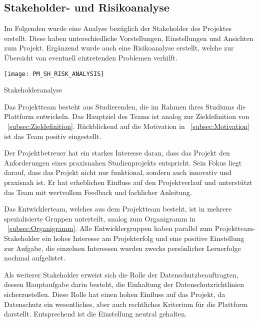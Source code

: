 \subsection{Stakeholder- und Risikoanalyse}\label{subsec:Stakeholder-Risikoanalyse}
Im Folgenden wurde eine Analyse bezüglich der Stakeholder des Projektes erstellt.
Diese haben unterschiedliche Vorstellungen, Einstellungen und Ansichten zum Projekt.
Ergänzend wurde auch eine Risikoanalyse erstellt, welche zur Übersicht von eventuell eintretenden Problemen verhilft. \par
\newpage %


\begin{table}[h!]
    \centering
    \texttt{[image: PM\_SH\_RISK\_ANALYSIS]}
    \caption{Stakeholderanalyse}\label{tab:stakegolderanalyse}
\end{table}

Das Projektteam besteht aus Studierenden, die im Rahmen ihres Studiums die Plattform entwickeln.
Das Hauptziel des Teams ist analog zur Zieldefinition von ~\ref{subsec:Zieldefinition}.
Rückblickend auf die Motivation in ~\ref{subsec:Motivation} ist das Team positiv eingestellt. \par

Der Projektbetreuer hat ein starkes Interesse daran, dass das Projekt den Anforderungen eines praxisnahen Studienprojekts entspricht.
Sein Fokus liegt darauf, dass das Projekt nicht nur funktional, sondern auch innovativ und praxisnah ist.
Er hat erheblichen Einfluss auf den Projektverlauf und unterstützt das Team mit wertvollem Feedback und fachlicher Anleitung. \par

Das Entwicklerteam, welches aus dem Projektteam besteht, ist in mehrere spezialisierte Gruppen unterteilt, analog zum Organigramm in ~\ref{subsec:Organigramm}.
Alle Entwicklergruppen haben parallel zum Projektteam-Stakeholder ein hohes Interesse am Projekterfolg und eine positive Einstellung zur Aufgabe, die einzelnen Interessen wurden zwecks persönlicher Lernerfolge nochmal aufgelistet. \par

Als weiterer Stakeholder erweist sich die Rolle der Datenschutzbeauftragten, dessen Hauptaufgabe darin besteht, die Einhaltung der Datenschutzrichtlinien sicherzustellen.
Diese Rolle hat einen hohen Einfluss auf das Projekt, da Datenschutz ein wesentliches, aber auch rechtliches Kriterium für die Plattform darstellt.
Entsprechend ist die Einstellung neutral gehalten. \par


